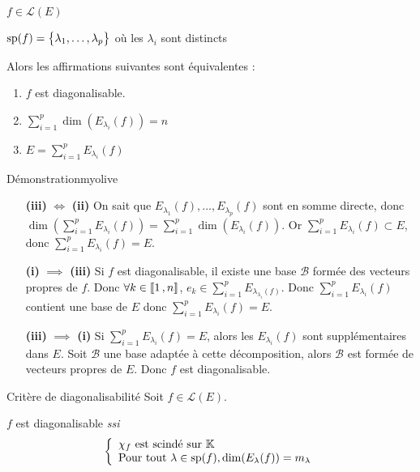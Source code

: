     \begin{prop}{}{}
        \begin{soient}
            \item $f \in \mathcal{L}(E)$
            \item $\sp(f) = \big\{ \lambda_1,\ldots,\lambda_p \big\}$ où les $\lambda_i$ sont distincts
        \end{soient}
        Alors les affirmations suivantes sont équivalentes :
        \begin{enumerate}
            \item $f$ est diagonalisable.
            \item $\sum_{i=1}^{p} \dim(E_{\lambda_i}(f)) = n$
            \item $E = \sum_{i=1}^{p} E_{\lambda_i}(f)$
        \end{enumerate}
    \end{prop}

    \begin{demo}{Démonstration}{myolive}
        \begin{itemize}[leftmargin=2cm]
            \item[\textbf{(iii)} $\iff$ \textbf{(ii)}] On sait que $E_{\lambda_1}(f), \ldots, E_{\lambda_p}(f)$ sont en somme directe, donc $\dim\left(\sum_{i=1}^{p} E_{\lambda_i}(f)\right) = \sum_{i=1}^{p} \dim(E_{\lambda_i}(f))$. Or $\sum_{i=1}^{p} E_{\lambda_i}(f) \subset E$, donc $\sum_{i=1}^{p} E_{\lambda_i}(f) = E$.
            \item[\textbf{(i)} $\implies$ \textbf{(iii)}] Si $f$ est diagonalisable, il existe une base $\mathcal{B}$ formée des vecteurs propres de $f$. Donc $\forall k \in \intervalleEntier{1}{n}$, $e_k \in \sum_{i=1}^{p} E_{\lambda_{\lambda_i}(f)}$. Donc $\sum_{i=1}^{p} E_{\lambda_i}(f)$ contient une base de $E$ donc $\sum_{i=1}^{p} E_{\lambda_i}(f) = E$.
            \item[\textbf{(iii)} $\implies$ \textbf{(i)}] Si $\sum_{i=1}^{p} E_{\lambda_i}(f) = E$, alors les $E_{\lambda_i}(f)$ sont supplémentaires dans $E$. Soit $\mathcal{B}$ une base adaptée à cette décomposition, alors $\mathcal{B}$ est formée de vecteurs propres de $E$. Donc $f$ est diagonalisable. 
        \end{itemize}
    \end{demo}

    \begin{theo}{Critère de diagonalisabilité}{}
        Soit $f \in \mathcal{L}(E)$.

        $f$ est diagonalisable \textit{ssi} 
        \[ \et{\chi_f \text{ est scindé sur } \mathbb{K}}{\text{Pour tout } \lambda \in \sp(f), \dim(E_{\lambda}(f)) = m_{\lambda}} \]
    \end{theo}

